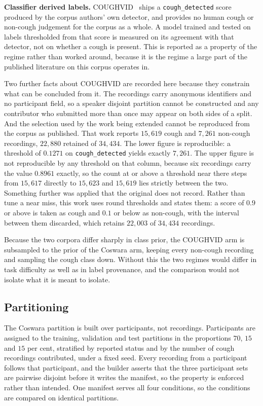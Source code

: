 \documentclass{ieeeaccess}
\begin{document}
\textbf{Classifier derived labels.} COUGHVID~\cite{coughvid2021} ships a
\texttt{cough\_detected} score produced by the corpus authors' own detector, and provides
no human cough or non-cough judgement for the corpus as a whole. A model trained and
tested on labels thresholded from that score is measured on its agreement with that
detector, not on whether a cough is present. This is reported as a property of the
regime rather than worked around, because it is the regime a large part of the published
literature on this corpus operates in.

Two further facts about COUGHVID are recorded here because they constrain what can be
concluded from it. The recordings carry anonymous identifiers and no participant field,
so a speaker disjoint partition cannot be constructed and any contributor who submitted
more than once may appear on both sides of a split. And the selection used by the work
being extended cannot be reproduced from the corpus as published. That work reports
$15{,}619$ cough and $7{,}261$ non-cough recordings, $22{,}880$ retained of $34{,}434$.
The lower figure is reproducible: a threshold of $0.1271$ on \texttt{cough\_detected}
yields exactly $7{,}261$. The upper figure is not reproducible by any threshold on that
column, because six recordings carry the value $0.8961$ exactly, so the count at or above
a threshold near there steps from $15{,}617$ directly to $15{,}623$ and $15{,}619$ lies
strictly between the two. Something further was applied that the original does not
record. Rather than tune a near miss, this work uses round thresholds and states them:
a score of $0.9$ or above is taken as cough and $0.1$ or below as non-cough, with the
interval between them discarded, which retains $22{,}003$ of $34{,}434$ recordings.

Because the two corpora differ sharply in class prior, the COUGHVID arm is subsampled to
the prior of the Coswara arm, keeping every non-cough recording and sampling the cough
class down. Without this the two regimes would differ in task difficulty as well as in
label provenance, and the comparison would not isolate what it is meant to isolate.

\subsection{Partitioning}\label{sec:setup-split}

The Coswara partition is built over participants, not recordings. Participants are
assigned to the training, validation and test partitions in the proportions $70$, $15$ and
$15$ per cent, stratified by reported status and by the number of cough recordings
contributed, under a fixed seed. Every recording from a participant follows that
participant, and the builder asserts that the three participant sets are pairwise
disjoint before it writes the manifest, so the property is enforced rather than intended.
One manifest serves all four conditions, so the conditions are compared on identical
partitions.
\end{document}
